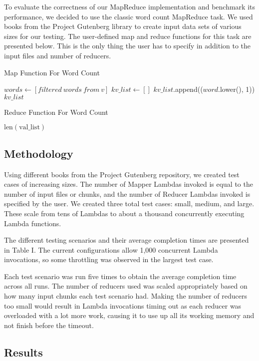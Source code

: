 To evaluate the correctness of our MapReduce implementation and benchmark its performance, we decided to use the classic word count MapReduce task. We used books from the Project Gutenberg library to create input data sets of various sizes for our testing. The user-defined map and reduce functions for this task are presented below. This is the only thing the user has to specify in addition to the input files and number of reducers.

\begin{algorithm}
\caption{Map Function For Word Count}
\begin{algorithmic}[1]
    \State $words \gets [filtered~words~from~v]$
    \State $kv\_list \gets []$
        \State $kv\_list$.append(($word$.lower(), 1))
    \EndFor
    \State \Return $kv\_list$
\EndFunction
\end{algorithmic}
\end{algorithm}

\begin{algorithm}
\caption{Reduce Function For Word Count}
\begin{algorithmic}[2]
    \State \Return $\text{len}(\text{val\_list})$
\EndFunction
\end{algorithmic}
\end{algorithm}

\subsection{Methodology}

Using different books from the Project Gutenberg repository, we created test cases of increasing sizes. The number of Mapper Lambdas invoked is equal to the number of input files or chunks, and the number of Reducer Lambdas invoked is specified by the user. We created three total test cases: small, medium, and large. These scale from tens of Lambdas to about a thousand concurrently executing Lambda functions.

The different testing scenarios and their average completion times are presented in Table I. The current configurations allow 1,000 concurrent Lambda invocations, so some throttling was observed in the largest test case.

Each test scenario was run five times to obtain the average completion time across all runs. The number of reducers used was scaled appropriately based on how many input chunks each test scenario had. Making the number of reducers too small would result in Lambda invocations timing out as each reducer was overloaded with a lot more work, causing it to use up all its working memory and not finish before the timeout.

\subsection{Results}
